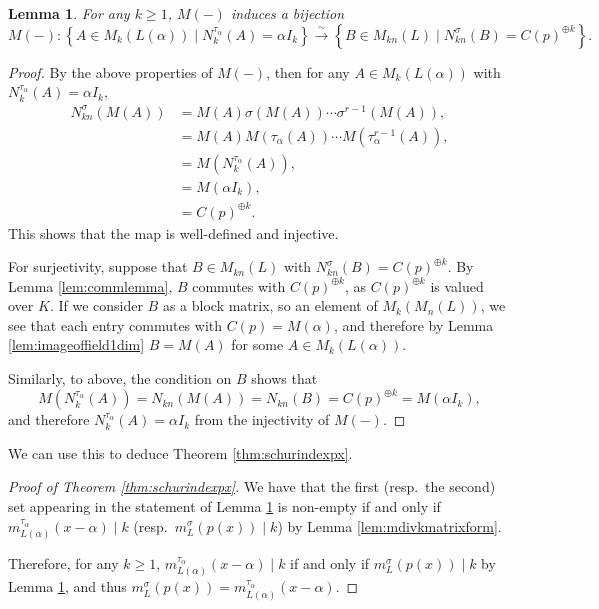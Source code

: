 \documentclass[10pt, reqno, hidelinks]{amsart}
\numberwithin{thm}{subsection}
\newtheorem{lemma}[thm]{Lemma}
\theoremstyle{definition}
\begin{document}
\begin{lemma}\label{lem:bijsolsetst1}
   For any $k \geq 1$, $M(-)$ induces a bijection
   \[
   M(-) \colon \left\{A \in M_k(L(\alpha)) \mid N_k^{\tau_{\alpha}}(A) = \alpha I_k \right\} \xrightarrow{\sim} \left\{ B \in M_{kn}(L) \mid N_{kn}^{\sigma}(B) = C(p)^{\oplus k} \right\}.
   \]
\end{lemma}

\begin{proof}
   By the above properties of $M(-)$, then for any $A \in M_k(L(\alpha))$ with $N_k^{\tau_{\alpha}}(A) = \alpha I_k$,
   \begin{align*}
   N_{kn}^{\sigma}(M(A)) &= M(A)\sigma(M(A)) \cdots \sigma^{r-1}(M(A)), \\
   &= M(A)M(\tau_{\alpha}(A)) \cdots M(\tau_{\alpha}^{r-1}(A)), \\
   &= M(N_{k}^{\tau_{\alpha}}(A)), \\
   &= M(\alpha I_k), \\
   &= C(p)^{\oplus k}.
   \end{align*}
   This shows that the map is well-defined and injective. 

   For surjectivity, suppose that $B \in M_{kn}(L)$ with $N_{kn}^{\sigma}(B) = C(p)^{\oplus k}$. By Lemma \ref{lem:commlemma}, $B$ commutes with $C(p)^{\oplus k}$, as $C(p)^{\oplus k}$ is valued over $K$. If we consider $B$ as a block matrix, so an element of $M_k(M_n(L))$, we see that each entry commutes with $C(p) = M(\alpha)$, and therefore by Lemma \ref{lem:imageoffield1dim} $B = M(A)$ for some $A \in M_k(L(\alpha))$. 

   Similarly, to above, the condition on $B$ shows that
   \[
   M(N_k^{\tau_{\alpha}}(A)) = N_{kn}(M(A)) = N_{kn}(B) = C(p)^{\oplus k} = M(\alpha I_k),
   \]
   and therefore $N_k^{\tau_{\alpha}}(A) = \alpha I_k$ from the injectivity of $M(-)$.
\end{proof}

We can use this to deduce Theorem \ref{thm:schurindexpx}.

\begin{proof}[Proof of Theorem \ref{thm:schurindexpx}]
   We have that the first (resp.\ the second) set appearing in the statement of Lemma \ref{lem:bijsolsetst1} is non-empty if and only if $m_{L(\alpha)}^{\tau_{\alpha}}(x - \alpha) \mid k$ (resp.\  $m_L^{\sigma}(p(x)) \mid k$) by Lemma \ref{lem:mdivkmatrixform}.
   
   Therefore, for any $k \geq 1$, $m_{L(\alpha)}^{\tau_{\alpha}}(x - \alpha) \mid k$ if and only if $m_L^{\sigma}(p(x)) \mid k$ by Lemma \ref{lem:bijsolsetst1}, and thus $m_L^{\sigma}(p(x)) = m_{L(\alpha)}^{\tau_{\alpha}}(x - \alpha)$.
\end{proof}
\end{document}
